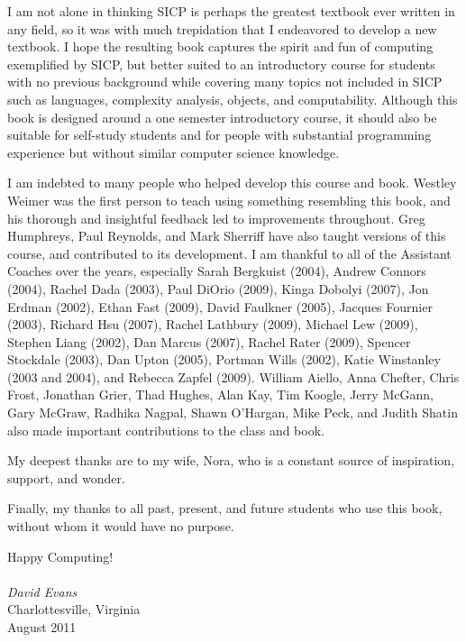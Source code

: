 \thispagestyle{plain}
I am not alone in thinking SICP is perhaps the greatest textbook ever written in any field, so it was with much trepidation that I endeavored to develop a new textbook. I hope the resulting book captures the spirit and fun of computing exemplified by SICP, but better suited to an introductory course for students with no previous background while covering many topics not included in SICP such as languages, complexity analysis, objects, and computability.  Although this book is designed around a one semester introductory course, it should also be suitable for self-study students and for people with substantial programming experience but without similar computer science knowledge.

I am indebted to many people who helped develop this course and book.  Westley Weimer was the first person to teach using something resembling this book, and his thorough and insightful feedback led to improvements throughout.  Greg Humphreys, Paul Reynolds, and Mark Sherriff have also taught versions of this course, and contributed to its development.  I am thankful to all of the Assistant Coaches over the years, especially 
Sarah Bergkuist (2004),
Andrew Connors (2004),
Rachel Dada (2003),
Paul DiOrio (2009),
Kinga Dobolyi (2007),
Jon Erdman (2002),  
Ethan Fast (2009),
David Faulkner (2005),
Jacques Fournier (2003),
Richard Hsu (2007),
Rachel Lathbury (2009),
Michael Lew (2009),
Stephen Liang (2002), 
Dan Marcus (2007),
Rachel Rater (2009),
Spencer Stockdale (2003), 
Dan Upton (2005),
Portman Wills (2002),
Katie Winstanley (2003 and 2004),
and Rebecca Zapfel (2009).
William Aiello, Anna Chefter, Chris Frost, Jonathan Grier, Thad Hughes, Alan Kay, Tim Koogle, Jerry McGann, Gary McGraw, Radhika Nagpal, Shawn O'Hargan, Mike Peck, and Judith Shatin also made important contributions to the class and book.    

My deepest thanks are to my wife, Nora, who is a constant source of inspiration, support, and wonder.

Finally, my thanks to all past, present, and future students who use this book, without whom it would have no purpose.

Happy Computing!\\
\vspace*{1.0ex}\\
{\em David Evans}\\
Charlottesville, Virginia\\
August 2011\\
\vspace*{1ex}


